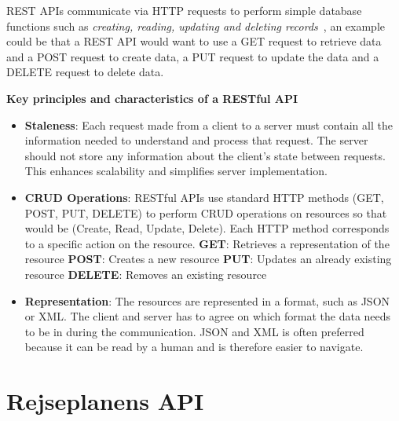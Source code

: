 REST APIs communicate via HTTP requests to perform simple database functions such as \textit{creating, reading,
    updating and deleting records}~\cite{IBMrestapi}, an example could be that a REST API would want to use a GET
request to retrieve data and a POST request to create data, a PUT request to update the data and a DELETE request to
delete data.

\textbf{Key principles and characteristics of a RESTful API}
\begin{itemize}
    \item \textbf{Staleness}: Each request made from a client to a server must contain all the information needed to
    understand and process that request.
    The server should not store any information about the client's state between requests.
    This enhances scalability and simplifies server implementation.
    \item \textbf{CRUD Operations}: RESTful APIs use standard HTTP methods (GET, POST, PUT, DELETE) to perform CRUD
    operations on resources so that would be (Create, Read, Update, Delete).
    Each HTTP method corresponds to a specific action on the resource.
    \subitem \textbf{GET}: Retrieves a representation of the resource
    \subitem \textbf{POST}: Creates a new resource
    \subitem \textbf{PUT}: Updates an already existing resource
    \subitem \textbf{DELETE}: Removes an existing resource
    \item \textbf{Representation}: The resources are represented in a format, such as JSON or XML.
    The client and server has to agree on which format the data needs to be in during the communication.
    JSON and XML is often preferred because it can be read by a human and is therefore easier to navigate.
\end{itemize}


\section{Rejseplanens API}\label{sec:rejseplanens-api}
